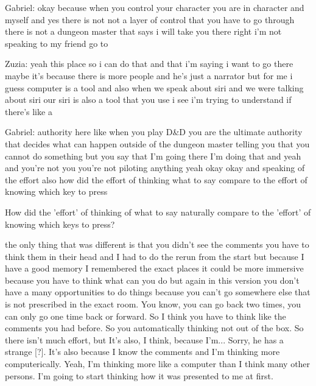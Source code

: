 \begin{QandA}
\begin{answered}
            Gabriel: okay because when you control your character you are in character and myself and yes there is not not a layer of control that you have to go through there is not a dungeon master that says i will take you there right i'm not speaking to my friend go to


            Zuzia: yeah this place so i can do that and that i'm saying i want to go there maybe it's because there is more people and he's just a narrator but for me i guess computer is a tool and also when we speak about siri and we were talking about siri our siri is also a tool that you use i see i'm trying to understand if there's like a


            Gabriel: authority here like when you play D\&D you are the ultimate authority that decides what can happen outside of the dungeon master telling you that you cannot do something but you say that I'm going there I'm doing that and yeah and you're not you you're not piloting anything yeah okay okay and speaking of the effort also how did the effort of thinking what to say compare to the effort of knowing which key to press


           
         \end{answered}

   \item How did the 'effort' of thinking of what to say naturally compare to the 'effort' of knowing which keys to press?

         \begin{answered}
            the only thing that was different is that you didn't see the comments you have to think them in their head and I had to do the rerun from the start but because I have a good memory I remembered the exact places it could be more immersive because you have to think what can you do but again in this version you don't have a
            many opportunities to do things because you can't go somewhere else that is not prescribed in the exact room.
            You know, you can go back two times, you can only go one time back or forward.
            So I think you have to think like the comments you had before.
            So you automatically thinking not out of the box.
            So there isn't much effort, but
            It's also, I think, because I'm...
            Sorry, he has a strange [?].
            It's also because I know the comments and I'm thinking more computerically.
            Yeah, I'm thinking more like a computer than I think many other persons.
            I'm going to start thinking how it was presented to me at first.
            

\end{answered}
\end{QandA}
